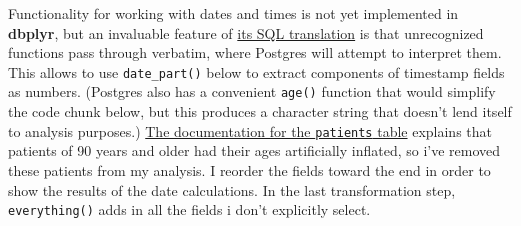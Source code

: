\documentclass[
]{article}
\begin{document}
Functionality for working with dates and times is not yet implemented in
\textbf{dbplyr}, but an invaluable feature of
\href{https://dbplyr.tidyverse.org/articles/sql-translation.html}{its
SQL translation} is that unrecognized functions pass through verbatim,
where Postgres will attempt to interpret them. This allows to use
\texttt{date\_part()} below to extract components of timestamp fields as
numbers. (Postgres also has a convenient \texttt{age()} function that
would simplify the code chunk below, but this produces a character
string that doesn't lend itself to analysis purposes.)
\href{https://mimic.physionet.org/mimictables/patients/}{The
documentation for the \texttt{patients} table} explains that patients of
90 years and older had their ages artificially inflated, so i've removed
these patients from my analysis. I reorder the fields toward the end in
order to show the results of the date calculations. In the last
transformation step, \texttt{everything()} adds in all the fields i
don't explicitly select.
\end{document}
